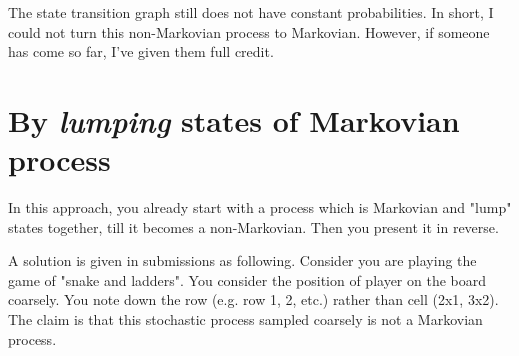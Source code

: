 \documentclass[a4paper,10pt]{article}
\begin{document}

The state transition graph still does not have constant probabilities. In
short, I could not turn this non-Markovian process to Markovian. However, if
someone has come so far, I've given them full credit.

\section{By \emph{lumping} states of Markovian process}

In this approach, you already start with a process which is Markovian and "lump"
states together, till it becomes a non-Markovian. Then you present it in
reverse. 

A solution is given in submissions as following. Consider you are playing the
game of "snake and ladders".  You consider the position of player on the board
coarsely. You note down the row (e.g. row 1, 2, etc.) rather than cell (2x1,
3x2). The claim is that this stochastic process sampled coarsely is not a
Markovian process. 
\end{document}
